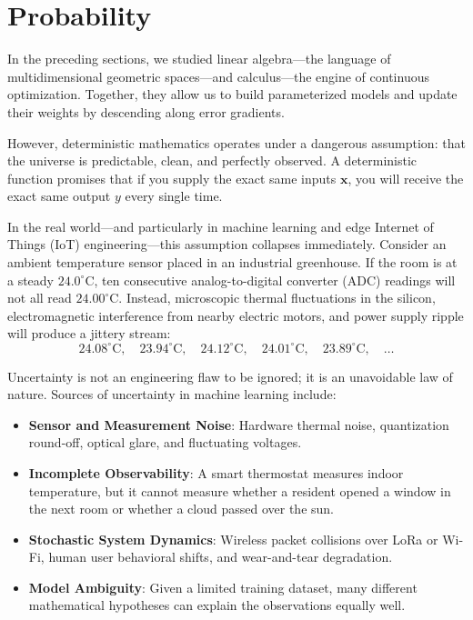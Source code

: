\section{Probability}\label{sec:probability}

In the preceding sections, we studied linear algebra---the language of multidimensional geometric spaces---and calculus---the engine of continuous optimization. Together, they allow us to build parameterized models and update their weights by descending along error gradients.

However, deterministic mathematics operates under a dangerous assumption: that the universe is predictable, clean, and perfectly observed. A deterministic function promises that if you supply the exact same inputs $\mathbf{x}$, you will receive the exact same output $y$ every single time.

In the real world---and particularly in machine learning and edge Internet of Things (IoT) engineering---this assumption collapses immediately. Consider an ambient temperature sensor placed in an industrial greenhouse. If the room is at a steady $24.0^\circ\text{C}$, ten consecutive analog-to-digital converter (ADC) readings will not all read $24.00^\circ\text{C}$. Instead, microscopic thermal fluctuations in the silicon, electromagnetic interference from nearby electric motors, and power supply ripple will produce a jittery stream:
\begin{equation*}
24.08^\circ\text{C}, \quad 23.94^\circ\text{C}, \quad 24.12^\circ\text{C}, \quad 24.01^\circ\text{C}, \quad 23.89^\circ\text{C}, \quad \dots
\end{equation*}

Uncertainty is not an engineering flaw to be ignored; it is an unavoidable law of nature. Sources of uncertainty in machine learning include:
\begin{itemize}
    \item \textbf{Sensor and Measurement Noise}: Hardware thermal noise, quantization round-off, optical glare, and fluctuating voltages.
    \item \textbf{Incomplete Observability}: A smart thermostat measures indoor temperature, but it cannot measure whether a resident opened a window in the next room or whether a cloud passed over the sun.
    \item \textbf{Stochastic System Dynamics}: Wireless packet collisions over LoRa or Wi-Fi, human user behavioral shifts, and wear-and-tear degradation.
    \item \textbf{Model Ambiguity}: Given a limited training dataset, many different mathematical hypotheses can explain the observations equally well.
\end{itemize}

